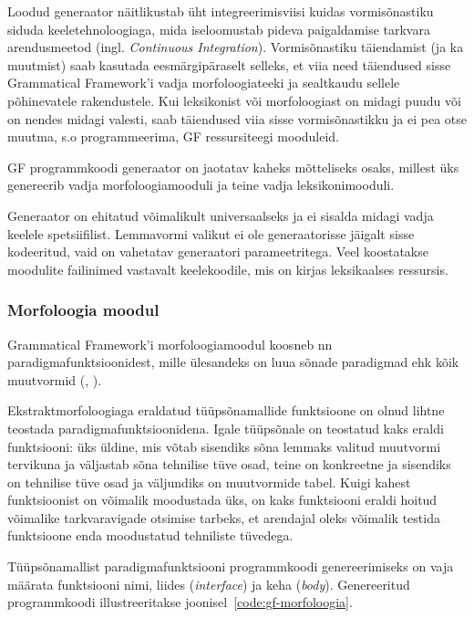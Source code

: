 \documentclass[12pt,a4paper]{article}
\begin{document}
Loodud generaator näitlikustab üht integreerimis\-viisi kuidas vormisõnastiku siduda keele\-tehnoloogiaga, mida iseloomustab pideva paigaldamise tarkvara arendusmeetod (ingl. \textit{Continuous Integration}). Vormisõnastiku täiendamist (ja ka muutmist) saab kasutada eesmärgipäraselt selleks, et viia need täiendused sisse Grammatical Framework'i vadja morfoloogia\-teeki ja sealt\-kaudu sellele põhinevatele rakendustele. Kui leksikonist või morfoloogiast on midagi puudu või on nendes midagi valesti, saab täiendused viia sisse vormi\-sõnastikku ja ei pea otse muutma, s.o programmeerima, GF ressursi\-teegi mooduleid.

GF programmkoodi generaator on jaotatav kaheks mõtteliseks osaks, millest üks genereerib vadja morfoloogia\-mooduli ja teine vadja leksikoni\-mooduli.

Generaator on ehitatud võimalikult universaalseks ja ei sisalda midagi vadja keelele spetsiifilist. Lemmavormi valikut ei ole generaatorisse jäigalt sisse kodeeritud, vaid on vahetatav generaatori parameetritega. Veel koostatakse moodulite faili\-nimed vastavalt keele\-koodile, mis on kirjas leksikaalses ressursis.



\subsubsection{Morfoloogia moodul}
\label{sec:gf-tüüpsõnad}
Grammatical Framework'i morfoloogiamoodul koosneb nn paradigma\-funktsioonidest, mille ülesandeks on luua sõnade paradigmad ehk kõik muutvormid (\cite[248]{ranta_grammatical_2011}, \cite[645]{detrez_smart_2012}).

Ekstrakt\-morfoloogiaga eraldatud tüüpsõna\-mallide funktsioone on olnud lihtne teostada paradigma\-funktsioonidena. Igale tüüpsõnale on teostatud kaks eraldi funktsiooni: üks üldine, mis võtab sisendiks sõna lemmaks valitud muutvormi tervikuna ja väljastab sõna tehnilise tüve osad, teine on konkreetne ja sisendiks on tehnilise tüve osad ja väljundiks on muutvormide tabel. Kuigi kahest funktsioonist on võimalik moodustada üks, on kaks funktsiooni eraldi hoitud võimalike tarkvara\-vigade otsimise tarbeks, et arendajal oleks võimalik testida funktsioone enda moodustatud tehniliste tüvedega.

Tüüpsõnamallist paradigmafunktsiooni programmkoodi genereerimiseks on vaja määrata funktsiooni nimi, liides (\textit{interface}) ja keha (\textit{body}). Genereeritud programm\-koodi illustreeritakse joonisel~\ref{code:gf-morfoloogia}. %
\end{document}
